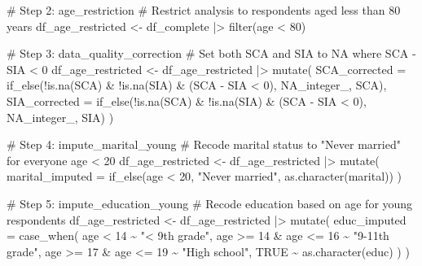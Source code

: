 \documentclass[aoas]{imsart}
\makeatletter
\newenvironment{Shaded}{\begin{snugshade}}{\end{snugshade}}
\newcommand{\AttributeTok}[1]{\textcolor[rgb]{0.40,0.45,0.13}{#1}}
\newcommand{\CommentTok}[1]{\textcolor[rgb]{0.37,0.37,0.37}{#1}}
\newcommand{\ConstantTok}[1]{\textcolor[rgb]{0.56,0.35,0.01}{#1}}
\newcommand{\DecValTok}[1]{\textcolor[rgb]{0.68,0.00,0.00}{#1}}
\newcommand{\FunctionTok}[1]{\textcolor[rgb]{0.28,0.35,0.67}{#1}}
\newcommand{\NormalTok}[1]{\textcolor[rgb]{0.00,0.23,0.31}{#1}}
\newcommand{\OtherTok}[1]{\textcolor[rgb]{0.00,0.23,0.31}{#1}}
\newcommand{\SpecialCharTok}[1]{\textcolor[rgb]{0.37,0.37,0.37}{#1}}
\newcommand{\StringTok}[1]{\textcolor[rgb]{0.13,0.47,0.30}{#1}}
\renewenvironment{Shaded}{}{}
\renewenvironment{codelisting}{%
    \def\@captype{codelisting}%
    \par\addvspace{0.5em}\noindent
  }{%
    \par\addvspace{0.5em}%
  }%
\makeatother
\begin{document}
\begin{codelisting}
{\begin{Shaded}
\begin{Highlighting}[]
\CommentTok{\# Step 2: age\_restriction}
\CommentTok{\# Restrict analysis to respondents aged less than 80 years}
\NormalTok{df\_age\_restricted }\OtherTok{\textless{}{-}}\NormalTok{ df\_complete }\SpecialCharTok{|\textgreater{}} \FunctionTok{filter}\NormalTok{(age }\SpecialCharTok{\textless{}} \DecValTok{80}\NormalTok{)}

\CommentTok{\# Step 3: data\_quality\_correction}
\CommentTok{\# Set both SCA and SIA to NA where SCA {-} SIA \textless{} 0}
\NormalTok{df\_age\_restricted }\OtherTok{\textless{}{-}}\NormalTok{ df\_age\_restricted }\SpecialCharTok{|\textgreater{}}
  \FunctionTok{mutate}\NormalTok{(}
    \AttributeTok{SCA\_corrected =} \FunctionTok{if\_else}\NormalTok{(}\SpecialCharTok{!}\FunctionTok{is.na}\NormalTok{(SCA) }\SpecialCharTok{\&} \SpecialCharTok{!}\FunctionTok{is.na}\NormalTok{(SIA) }\SpecialCharTok{\&}\NormalTok{ (SCA }\SpecialCharTok{{-}}\NormalTok{ SIA }\SpecialCharTok{\textless{}} \DecValTok{0}\NormalTok{), }\ConstantTok{NA\_integer\_}\NormalTok{, SCA),}
    \AttributeTok{SIA\_corrected =} \FunctionTok{if\_else}\NormalTok{(}\SpecialCharTok{!}\FunctionTok{is.na}\NormalTok{(SCA) }\SpecialCharTok{\&} \SpecialCharTok{!}\FunctionTok{is.na}\NormalTok{(SIA) }\SpecialCharTok{\&}\NormalTok{ (SCA }\SpecialCharTok{{-}}\NormalTok{ SIA }\SpecialCharTok{\textless{}} \DecValTok{0}\NormalTok{), }\ConstantTok{NA\_integer\_}\NormalTok{, SIA)}
\NormalTok{  )}

\CommentTok{\# Step 4: impute\_marital\_young}
\CommentTok{\# Recode marital status to "Never married" for everyone age \textless{} 20}
\NormalTok{df\_age\_restricted }\OtherTok{\textless{}{-}}\NormalTok{ df\_age\_restricted }\SpecialCharTok{|\textgreater{}}
  \FunctionTok{mutate}\NormalTok{(}
    \AttributeTok{marital\_imputed =} \FunctionTok{if\_else}\NormalTok{(age }\SpecialCharTok{\textless{}} \DecValTok{20}\NormalTok{, }\StringTok{"Never married"}\NormalTok{, }\FunctionTok{as.character}\NormalTok{(marital))}
\NormalTok{  )}

\CommentTok{\# Step 5: impute\_education\_young}
\CommentTok{\# Recode education based on age for young respondents}
\NormalTok{df\_age\_restricted }\OtherTok{\textless{}{-}}\NormalTok{ df\_age\_restricted }\SpecialCharTok{|\textgreater{}}
  \FunctionTok{mutate}\NormalTok{(}
    \AttributeTok{educ\_imputed =} \FunctionTok{case\_when}\NormalTok{(}
\NormalTok{      age }\SpecialCharTok{\textless{}} \DecValTok{14} \SpecialCharTok{\textasciitilde{}} \StringTok{"\textless{} 9th grade"}\NormalTok{,}
\NormalTok{      age }\SpecialCharTok{\textgreater{}=} \DecValTok{14} \SpecialCharTok{\&}\NormalTok{ age }\SpecialCharTok{\textless{}=} \DecValTok{16} \SpecialCharTok{\textasciitilde{}} \StringTok{"9{-}11th grade"}\NormalTok{,}
\NormalTok{      age }\SpecialCharTok{\textgreater{}=} \DecValTok{17} \SpecialCharTok{\&}\NormalTok{ age }\SpecialCharTok{\textless{}=} \DecValTok{19} \SpecialCharTok{\textasciitilde{}} \StringTok{"High school"}\NormalTok{,}
      \ConstantTok{TRUE} \SpecialCharTok{\textasciitilde{}} \FunctionTok{as.character}\NormalTok{(educ)}
\NormalTok{    )}
\NormalTok{  )}


\end{Highlighting}
\end{Shaded}}
\end{codelisting}
\end{document}
